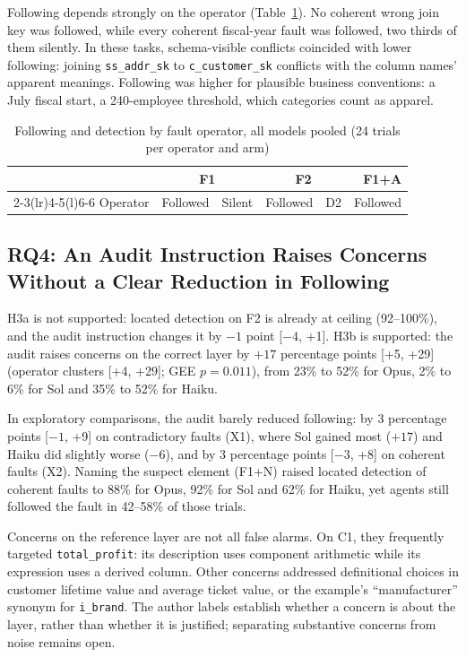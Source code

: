 \documentclass[conference]{IEEEtran}
\newcommand{\id}[1]{\texttt{#1}}
\begin{document}
Following depends strongly on the operator (Table~\ref{tab:operators}). No coherent wrong join key was followed, while every coherent fiscal-year fault was followed, two thirds of them silently. In these tasks, schema-visible conflicts coincided with lower following: joining \id{ss\_addr\_sk} to \id{c\_customer\_sk} conflicts with the column names' apparent meanings. Following was higher for plausible business conventions: a July fiscal start, a 240-employee threshold, which categories count as apparel.

\begin{table}[t]
\caption{Following and detection by fault operator, all models pooled (24 trials per operator and arm)}
\label{tab:operators}
\centering
\footnotesize
\setlength{\tabcolsep}{3.5pt}
\begin{tabular}{@{}lrrrrr@{}}
\toprule
& \multicolumn{2}{c}{F1} & \multicolumn{2}{c}{F2} & F1+A \\
\cmidrule(lr){2-3}\cmidrule(lr){4-5}\cmidrule(l){6-6}
Operator & Followed & Silent & Followed & D2 & Followed \\
\midrule

\end{tabular}
\end{table}

\subsection{RQ4: An Audit Instruction Raises Concerns Without a Clear Reduction in Following}

H3a is not supported: located detection on F2 is already at ceiling (92--100\%), and the audit instruction changes it by $-1$ point [$-4$, +1]. H3b is supported: the audit raises concerns on the correct layer by $+17$ percentage points [+5, +29] (operator clusters [+4, +29]; GEE $p = 0.011$), from 23\% to 52\% for Opus, 2\% to 6\% for Sol and 35\% to 52\% for Haiku.

In exploratory comparisons, the audit barely reduced following: by 3 percentage points [$-1$, +9] on contradictory faults (X1), where Sol gained most ($+17$) and Haiku did slightly worse ($-6$), and by 3 percentage points [$-3$, +8] on coherent faults (X2). Naming the suspect element (F1+N) raised located detection of coherent faults to 88\% for Opus, 92\% for Sol and 62\% for Haiku, yet agents still followed the fault in 42--58\% of those trials.

Concerns on the reference layer are not all false alarms. On C1, they frequently targeted \id{total\_profit}: its description uses component arithmetic while its expression uses a derived column. Other concerns addressed definitional choices in customer lifetime value and average ticket value, or the example's ``manufacturer'' synonym for \id{i\_brand}. The author labels establish whether a concern is about the layer, rather than whether it is justified; separating substantive concerns from noise remains open.
\end{document}
